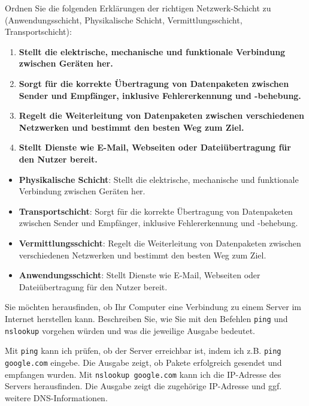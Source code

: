 \begin{myexercise}

    Ordnen Sie die folgenden Erklärungen der richtigen Netzwerk-Schicht zu (Anwendungsschicht, Physikalische Schicht, Vermittlungsschicht, Transportschicht):

    \begin{enumerate}
        \item \textbf{Stellt die elektrische, mechanische und funktionale Verbindung zwischen Geräten her.}
        \item \textbf{Sorgt für die korrekte Übertragung von Datenpaketen zwischen Sender und Empfänger, inklusive Fehlererkennung und -behebung.}
        \item \textbf{Regelt die Weiterleitung von Datenpaketen zwischen verschiedenen Netzwerken und bestimmt den besten Weg zum Ziel.}
        \item \textbf{Stellt Dienste wie E-Mail, Webseiten oder Dateiübertragung für den Nutzer bereit.}
    \end{enumerate}

    \begin{myanswer}
        \begin{itemize}
            \item \textbf{Physikalische Schicht}: Stellt die elektrische, mechanische und funktionale Verbindung zwischen Geräten her.
            \item \textbf{Transportschicht}: Sorgt für die korrekte Übertragung von Datenpaketen zwischen Sender und Empfänger, inklusive Fehlererkennung und -behebung.
            \item \textbf{Vermittlungsschicht}: Regelt die Weiterleitung von Datenpaketen zwischen verschiedenen Netzwerken und bestimmt den besten Weg zum Ziel.
            \item \textbf{Anwendungsschicht}: Stellt Dienste wie E-Mail, Webseiten oder Dateiübertragung für den Nutzer bereit.
        \end{itemize}
    \end{myanswer}
\end{myexercise}

\begin{myexercise}

    Sie möchten herausfinden, ob Ihr Computer eine Verbindung zu einem Server im Internet herstellen kann. Beschreiben Sie, wie Sie mit den Befehlen \texttt{ping} und \texttt{nslookup} vorgehen würden und was die jeweilige Ausgabe bedeutet.

    \begin{myanswer}
        Mit \texttt{ping} kann ich prüfen, ob der Server erreichbar ist, indem ich z.B. \texttt{ping google.com} eingebe. Die Ausgabe zeigt, ob Pakete erfolgreich gesendet und empfangen wurden. Mit \texttt{nslookup google.com} kann ich die IP-Adresse des Servers herausfinden. Die Ausgabe zeigt die zugehörige IP-Adresse und ggf. weitere DNS-Informationen.
    \end{myanswer}
\end{myexercise}

